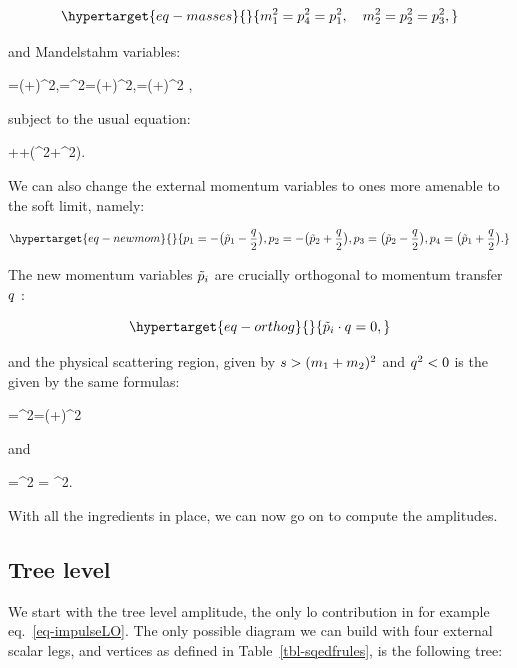 \documentclass[
  11pt,
  a4paper,
  DIV=11,
  numbers=noendperiod,
  twoside]{scrreprt}
\let\[\relax \let\]\relax %
\DeclareRobustCommand{\[}{\begin{equation}}
\DeclareRobustCommand{\]}{\end{equation}}
\begin{document}
\begin{equation}\protect\hypertarget{eq-masses}{}{
 \mass[1]^2=\emom[4]^2 =\emom[1]^2,\quad \mass[2]^2=\emom[2]^2 =\emom[3]^2,
}\label{eq-masses}\end{equation}

and Mandelstahm variables:

\[
 \mands=(\emom[1]+\emom[2])^2,\quad \mandt=\tm^2=(\emom[1]+\emom[4])^2,\quad \mandu=(\emom[1]+\emom[3])^2   ,
\]

subject to the usual equation:

\[
\mands+\mandt+(\mass[1]^2+\mass[2]^2).
\]

We can also change the external momentum variables to ones more amenable
to the soft limit, namely:

\begin{equation}\protect\hypertarget{eq-newmom}{}{
\emom[1]=-\pa[\big]{\semom[1]-\Half[\tm]}, \emom[2]=-\pa[\big]{\semom[2]+\Half[\tm]}, \emom[3]=\pa[\big]{\semom[2]-\Half[\tm]}, \emom[4]=\pa[\big]{\semom[1]+\Half[\tm]} .
}\label{eq-newmom}\end{equation}

The new momentum variables \(\semom[i]\) are crucially orthogonal to
momentum transfer \(\tm\) :

\begin{equation}\protect\hypertarget{eq-orthog}{}{
\semom[i]\cdot\tm=0,
}\label{eq-orthog}\end{equation}

and the physical scattering region, given by
\(\mands>(\mass[1]+\mass[2])^2\) and \(\tm^2<0\) is the given by the
same formulas:

\[
\mands=\pa[\Big]{-\pa[\big]{\semom[1]-\Half[\tm]}-\pa[\big]{\semom[2]+\Half[\tm]}}^2=(\semom[1]+\semom[2])^2
\]

and

\[
\mandt=\pa[\Big]{-\pa[\big]{\semom[1]-\Half[\tm]}+\semom[1]+\Half[\tm]}^2 = \tm^2.
\]

With all the ingredients in place, we can now go on to compute the
amplitudes.

\hypertarget{tree-level}{%
\subsection{Tree level}\label{tree-level}}

We start with the tree level amplitude, the only \gls{lo} contribution
in for example eq.~\ref{eq-impulseLO}. The only possible diagram we can
build with four external scalar legs, and vertices as defined in
Table~\ref{tbl-sqedfrules}, is the following tree:
\end{document}
